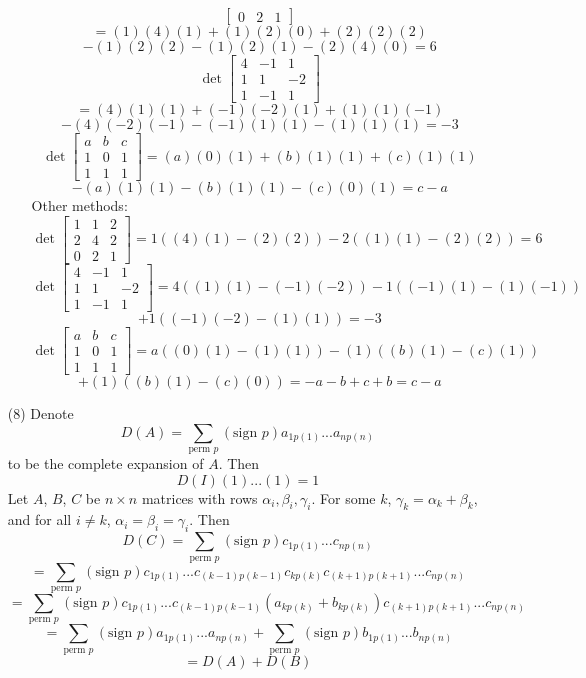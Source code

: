 \begin{itemize}
\begin{itemize}
$$\begin{bmatrix}
0 & 2 & 1
\end{bmatrix}$$
$$= (1)(4)(1) + (1)(2)(0) + (2)(2)(2)$$
$$- (1)(2)(2) - (1)(2)(1) - (2)(4)(0) = 6$$
$$\det\begin{bmatrix}
4 & -1 & 1 \\
1 & 1 & -2 \\
1 & -1 & 1
\end{bmatrix}$$
$$= (4)(1)(1) + (-1)(-2)(1) + (1)(1)(-1)$$ 
$$- (4)(-2)(-1) - (-1)(1)(1) - (1)(1)(1) = -3$$
$$\det\begin{bmatrix}
a & b & c \\
1 & 0 & 1 \\
1 & 1 & 1
\end{bmatrix} = (a)(0)(1) + (b)(1)(1) + (c)(1)(1)$$
$$- (a)(1)(1) - (b)(1)(1) - (c)(0)(1) = c - a$$
Other methods:
$$\det\begin{bmatrix}
1 & 1 & 2 \\
2 & 4 & 2 \\
0 & 2 & 1
\end{bmatrix} = 1((4)(1) - (2)(2)) - 2((1)(1) - (2)(2)) = 6$$
$$\det\begin{bmatrix}
4 & -1 & 1 \\
1 & 1 & -2 \\
1 & -1 & 1
\end{bmatrix} = 4((1)(1) - (-1)(-2)) - 1((-1)(1) - (1)(-1))$$
$$+ 1((-1)(-2) - (1)(1)) = -3$$
$$\det\begin{bmatrix}
a & b & c \\
1 & 0 & 1 \\
1 & 1 & 1
\end{bmatrix} = a((0)(1) - (1)(1)) - (1)((b)(1) - (c)(1))$$
$$+ (1)((b)(1) - (c)(0)) = -a - b + c + b = c - a$$
\end{itemize}
\item[(8)]
Denote 
$$D(A) = \sum_{\text{perm }p}(\text{sign }p)a_{1p(1)}...a_{np(n)}$$
to be the complete expansion of $A$. Then
$$D(I) (1)...(1) = 1$$
Let $A$, $B$, $C$ be $n \times n$ matrices with rows $\alpha_i, \beta_i, \gamma_i$. For some $k$, $\gamma_k = \alpha_k + \beta_k$, and for all $i \neq k$, $\alpha_i = \beta_i = \gamma_i$. Then
$$D(C) = \sum_{\text{perm }p}(\text{sign }p)c_{1p(1)}...c_{np(n)}$$
$$= \sum_{\text{perm }p}(\text{sign }p)c_{1p(1)}...c_{(k-1)p(k-1)}c_{kp(k)}c_{(k+1)p(k+1)}...c_{np(n)}$$
$$= \sum_{\text{perm }p}(\text{sign }p)c_{1p(1)}...c_{(k-1)p(k-1)}(a_{kp(k)} + b_{kp(k)})c_{(k+1)p(k+1)}...c_{np(n)}$$
$$= \sum_{\text{perm }p}(\text{sign }p)a_{1p(1)}...a_{np(n)} + \sum_{\text{perm }p}(\text{sign }p)b_{1p(1)}...b_{np(n)}$$
$$= D(A) + D(B)$$

\end{itemize}
